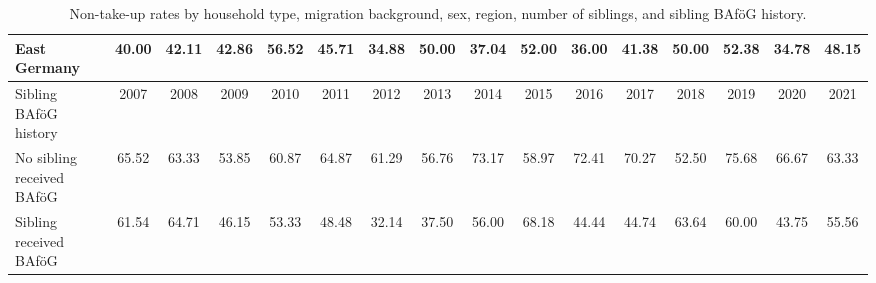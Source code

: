 \begin{landscape}
\begin{table}[htbp]
\begin{tabular}{lccccccccccccccc}
East Germany & 40.00 & 42.11 & 42.86 & 56.52 & 45.71 & 34.88 & 50.00 & 37.04 & 52.00 & 36.00 & 41.38 & 50.00 & 52.38 & 34.78 & 48.15 \\
\midrule
Sibling BAföG history & 2007 & 2008 & 2009 & 2010 & 2011 & 2012 & 2013 & 2014 & 2015 & 2016 & 2017 & 2018 & 2019 & 2020 & 2021 \\
\midrule
No sibling received BAföG & 65.52 & 63.33 & 53.85 & 60.87 & 64.87 & 61.29 & 56.76 & 73.17 & 58.97 & 72.41 & 70.27 & 52.50 & 75.68 & 66.67 & 63.33 \\
Sibling received BAföG    & 61.54 & 64.71 & 46.15 & 53.33 & 48.48 & 32.14 & 37.50 & 56.00 & 68.18 & 44.44 & 44.74 & 63.64 & 60.00 & 43.75 & 55.56 \\
\bottomrule
\end{tabular}
\caption{Non-take-up rates by household type, migration background, sex, region, number of siblings, and sibling BAföG history.}
\end{table}
\end{landscape}

